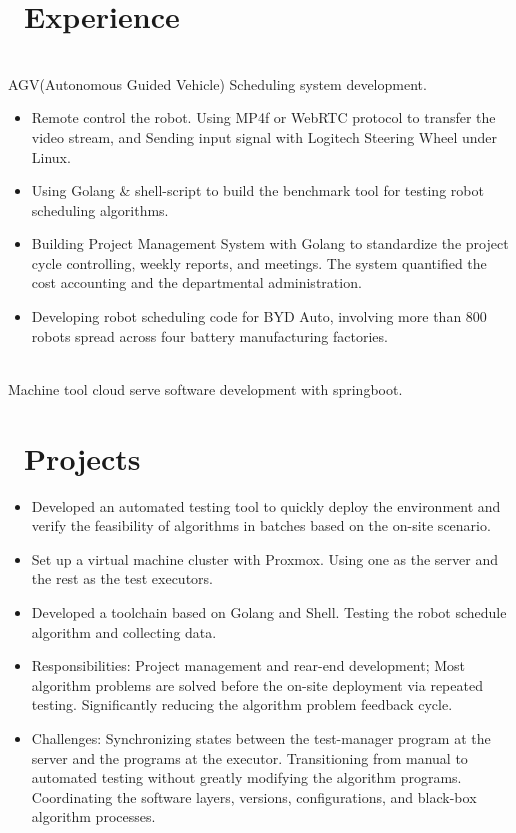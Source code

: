 \documentclass[a4paper,10pt]{resume}
\begin{document}
\section{\faUsers\ Experience}
\\AGV(Autonomous Guided Vehicle) Scheduling system development.
\begin{itemize}
  \item Remote control the robot. Using MP4f or WebRTC protocol to transfer the video stream, and Sending input signal with Logitech Steering Wheel under Linux.
  \item Using Golang \& shell-script to build the benchmark tool for testing robot scheduling algorithms.
  \item Building Project Management System with Golang to standardize the project cycle controlling, weekly reports, and meetings. The system quantified the cost accounting and the departmental administration.
  \item Developing robot scheduling code for BYD Auto, involving more than 800 robots spread across four battery manufacturing factories.
\end{itemize}

\\ Machine tool cloud serve software development with springboot.

\section{\faFile\ Projects}
\begin{itemize}[parsep=0.5ex]
  \item Developed an automated testing tool to quickly deploy the environment and verify the feasibility of algorithms in batches based on the on-site scenario.
  \item Set up a virtual machine cluster with Proxmox. Using one as the server and the rest as the test executors.
  \item Developed a toolchain based on Golang and Shell. Testing the robot schedule algorithm and collecting data.
  \item Responsibilities: Project management and rear-end development; Most algorithm problems are solved before the on-site deployment via repeated testing. Significantly reducing the algorithm problem feedback cycle.
  \item Challenges: Synchronizing states between the test-manager program at the server and the programs at the executor. Transitioning from manual to automated testing without greatly modifying the algorithm programs. Coordinating the software layers, versions, configurations, and black-box algorithm processes.
\end{itemize}
\end{document}
